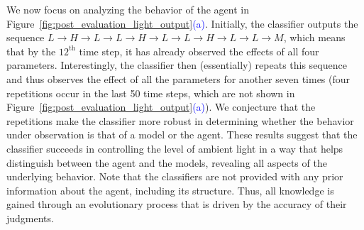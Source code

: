 We now focus on analyzing the behavior of the agent in Figure~\ref{fig:post_evaluation_light_output}\textcolor{blue}{(a)}. Initially, the classifier outputs the sequence $L \rightarrow H\rightarrow L\rightarrow L \rightarrow H\rightarrow L\rightarrow L\rightarrow H\rightarrow L\rightarrow L\rightarrow M$, which means that by the $12^\textrm{th}$ time step, it has already observed the effects of all four parameters. Interestingly, the classifier then (essentially) repeats this sequence and thus observes the effect of all the parameters for another seven times (four repetitions occur in the last 50 time steps, which are not shown in Figure~\ref{fig:post_evaluation_light_output}\textcolor{blue}{(a)}). We conjecture that the repetitions make the classifier more robust in determining whether the behavior under observation is that of a model or the agent.
These results suggest that the classifier succeeds in controlling the level of ambient light in a way that helps distinguish between the agent and the models, revealing all aspects of the underlying behavior. Note that the classifiers are not provided with any prior information about the agent, including its structure. Thus, all knowledge is gained through an evolutionary process that is driven by the accuracy of their judgments.

